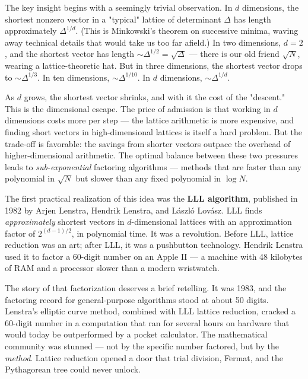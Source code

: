 The key insight begins with a seemingly trivial observation. In $d$ dimensions, the shortest nonzero vector in a "typical" lattice of determinant $\Delta$ has length approximately $\Delta^{1/d}$. (This is Minkowski's theorem on successive minima, waving away technical details that would take us too far afield.) In two dimensions, $d = 2$, and the shortest vector has length $\sim \Delta^{1/2} = \sqrt{\Delta}$ --- there is our old friend $\sqrt{N}$, wearing a lattice-theoretic hat. But in three dimensions, the shortest vector drops to $\sim \Delta^{1/3}$. In ten dimensions, $\sim \Delta^{1/10}$. In $d$ dimensions, $\sim \Delta^{1/d}$.

As $d$ grows, the shortest vector shrinks, and with it the cost of the "descent." This is the dimensional escape. The price of admission is that working in $d$ dimensions costs more per step --- the lattice arithmetic is more expensive, and finding short vectors in high-dimensional lattices is itself a hard problem. But the trade-off is favorable: the savings from shorter vectors outpace the overhead of higher-dimensional arithmetic. The optimal balance between these two pressures leads to \textit{sub-exponential} factoring algorithms --- methods that are faster than any polynomial in $\sqrt{N}$ but slower than any fixed polynomial in $\log N$.

The first practical realization of this idea was the \textbf{LLL algorithm}, published in 1982 by Arjen Lenstra, Hendrik Lenstra, and László Lovász. LLL finds \textit{approximately} shortest vectors in $d$-dimensional lattices with an approximation factor of $2^{(d-1)/2}$, in polynomial time. It was a revolution. Before LLL, lattice reduction was an art; after LLL, it was a pushbutton technology. Hendrik Lenstra used it to factor a 60-digit number on an Apple II --- a machine with 48 kilobytes of RAM and a processor slower than a modern wristwatch.

The story of that factorization deserves a brief retelling. It was 1983, and the factoring record for general-purpose algorithms stood at about 50 digits. Lenstra's elliptic curve method, combined with LLL lattice reduction, cracked a 60-digit number in a computation that ran for several hours on hardware that would today be outperformed by a pocket calculator. The mathematical community was stunned --- not by the specific number factored, but by the \textit{method}. Lattice reduction opened a door that trial division, Fermat, and the Pythagorean tree could never unlock.

